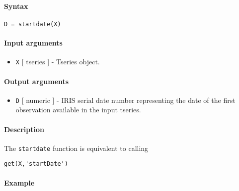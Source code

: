 


	\paragraph{Syntax}

\begin{verbatim}
D = startdate(X)
\end{verbatim}

\paragraph{Input arguments}

\begin{itemize}
\itemsep1pt\parskip0pt
\item
  \texttt{X} {[} tseries {]} - Tseries object.
\end{itemize}

\paragraph{Output arguments}

\begin{itemize}
\itemsep1pt\parskip0pt
\item
  \texttt{D} {[} numeric {]} - IRIS serial date number representing the
  date of the first observation available in the input tseries.
\end{itemize}

\paragraph{Description}

The \texttt{startdate} function is equivalent to calling

\begin{verbatim}
get(X,'startDate')
\end{verbatim}

\paragraph{Example}


